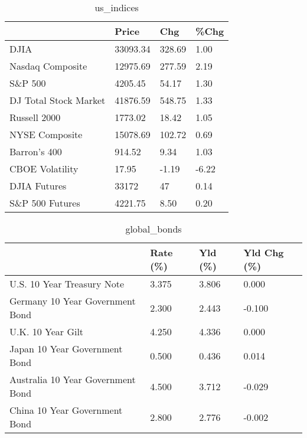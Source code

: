 \documentclass{article}%
\begin{document}
%


\begin{table}[htbp]%
\caption{us\_indices}%
\centering%
\begin{adjustbox}{width=1\textwidth}%
\begin{tabular}{llll}
\toprule
                      &    Price &    Chg &  \%Chg \\
\midrule
                 DJIA & 33093.34 & 328.69 &  1.00 \\
     Nasdaq Composite & 12975.69 & 277.59 &  2.19 \\
              S\&P 500 &  4205.45 &  54.17 &  1.30 \\
DJ Total Stock Market & 41876.59 & 548.75 &  1.33 \\
         Russell 2000 &  1773.02 &  18.42 &  1.05 \\
       NYSE Composite & 15078.69 & 102.72 &  0.69 \\
         Barron's 400 &   914.52 &   9.34 &  1.03 \\
      CBOE Volatility &    17.95 &  -1.19 & -6.22 \\
         DJIA Futures &    33172 &     47 &  0.14 \\
      S\&P 500 Futures &  4221.75 &   8.50 &  0.20 \\
\bottomrule
\end{tabular}
%
\end{adjustbox}%
\end{table}

%


\begin{table}[htbp]%
\caption{global\_bonds}%
\centering%
\begin{adjustbox}{width=1\textwidth}%
\begin{tabular}{llll}
\toprule
                                  & Rate (\%) & Yld (\%) & Yld Chg (\%) \\
\midrule
       U.S. 10 Year Treasury Note &    3.375 &   3.806 &       0.000 \\
  Germany 10 Year Government Bond &    2.300 &   2.443 &      -0.100 \\
                U.K. 10 Year Gilt &    4.250 &   4.336 &       0.000 \\
    Japan 10 Year Government Bond &    0.500 &   0.436 &       0.014 \\
Australia 10 Year Government Bond &    4.500 &   3.712 &      -0.029 \\
    China 10 Year Government Bond &    2.800 &   2.776 &      -0.002 \\
\bottomrule
\end{tabular}
%
\end{adjustbox}%
\end{table}
\end{document}
